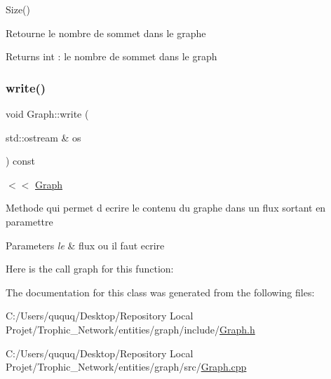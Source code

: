 Size() 

Retourne le nombre de sommet dans le graphe

\begin{DoxyReturn}{Returns}
int \+: le nombre de sommet dans le graph 
\end{DoxyReturn}
\mbox{\label{class_graph_aada8884f6aea111f9b36d8dfb3e5c0a9}} 
\subsubsection{\texorpdfstring{write()}{write()}}
{\footnotesize\ttfamily void Graph\+::write (\begin{DoxyParamCaption}\item[{std\+::ostream \&}]{os }\end{DoxyParamCaption}) const}



$<$$<$ \mbox{\hyperlink{class_graph}{Graph}} 

Methode qui permet d ecrire le contenu du graphe dans un flux sortant en paramettre


\begin{DoxyParams}{Parameters}
{\em le} & flux ou il faut ecrire \\
\hline
\end{DoxyParams}
Here is the call graph for this function\+:


The documentation for this class was generated from the following files\+:\begin{DoxyCompactItemize}
\item 
C\+:/\+Users/ququq/\+Desktop/\+Repository Local Projet/\+Trophic\+\_\+\+Network/entities/graph/include/\mbox{\hyperlink{_graph_8h}{Graph.\+h}}\item 
C\+:/\+Users/ququq/\+Desktop/\+Repository Local Projet/\+Trophic\+\_\+\+Network/entities/graph/src/\mbox{\hyperlink{_graph_8cpp}{Graph.\+cpp}}\end{DoxyCompactItemize}
